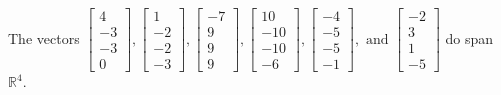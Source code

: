 \begin{exercise}
\begin{exerciseStatement}
  \end{exerciseStatement}
  \begin{exerciseAnswer}
   The vectors \(\left[\begin{array}{r}
4 \\
-3 \\
-3 \\
0
\end{array}\right] , \left[\begin{array}{r}
1 \\
-2 \\
-2 \\
-3
\end{array}\right] , \left[\begin{array}{r}
-7 \\
9 \\
9 \\
9
\end{array}\right] , \left[\begin{array}{r}
10 \\
-10 \\
-10 \\
-6
\end{array}\right] , \left[\begin{array}{r}
-4 \\
-5 \\
-5 \\
-1
\end{array}\right] , \text{ and } \left[\begin{array}{r}
-2 \\
3 \\
1 \\
-5
\end{array}\right]\) 
  	 do  
	span \(\mathbb{R}^4\).
  


  \end{exerciseAnswer}
\end{exercise}